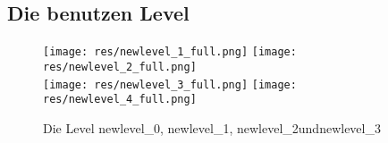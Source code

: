 \documentclass[11pt]{scrartcl}
\begin{document}
\subsection{Die benutzen Level}
\label{sec:levels}
\begin{figure}[htp]
\centering
\texttt{[image: res/newlevel\_1\_full.png]}
\texttt{[image: res/newlevel\_2\_full.png]}
\newline
\hspace{10pt}\\
\texttt{[image: res/newlevel\_3\_full.png]}
\texttt{[image: res/newlevel\_4\_full.png]}

\caption{
  Die Level \grqq newlevel\_0\grqq, \grqq newlevel\_1\grqq,
            \grqq newlevel\_2\grqq und\grqq newlevel\_3\grqq
        }
\end{figure}
\end{document}
